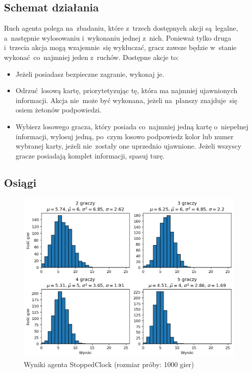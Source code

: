 \documentclass[declaration,shortabstract,inz]{iithesis}
\begin{document}
\subsection*{Schemat działania}

Ruch agenta polega na~zbadaniu, które z~trzech dostępnych akcji są~legalne, a~następnie wylosowaniu i~wykonaniu jednej z~nich. Ponieważ tylko druga i~trzecia akcja mogą wzajemnie~się wykluczać, gracz zawsze będzie w~stanie wykonać co~najmniej jeden z~ruchów. Dostępne akcje to:

\begin{itemize}
	\item Jeżeli posiadasz bezpieczne zagranie, wykonaj je.
	\item Odrzuć losową kartę, priorytetyzując tę, która ma najmniej ujawnionych informacji. Akcja nie~może być wykonana, jeżeli na~planszy znajduje~się osiem żetonów podpowiedzi.
	\item Wybierz losowego gracza, który posiada co~najmniej jedną kartę o~niepełnej informacji, wylosuj jedną, po~czym losowo podpowiedz kolor lub numer wybranej karty, jeżeli nie~zostały one uprzednio ujawnione. Jeżeli wszyscy gracze posiadają komplet informacji, spasuj turę.
\end{itemize}

\subsection*{Osiągi}

\begin{figure}[H]
	\centering
	\captionsetup{format=hang}
	\includegraphics[width=\textwidth,height=\textheight,keepaspectratio]{StoppedClock.png}
	\caption[Caption]{Wyniki agenta StoppedClock (rozmiar próby: 1000 gier)}
	\label{fig:StoppedClock}
\end{figure}
\end{document}
